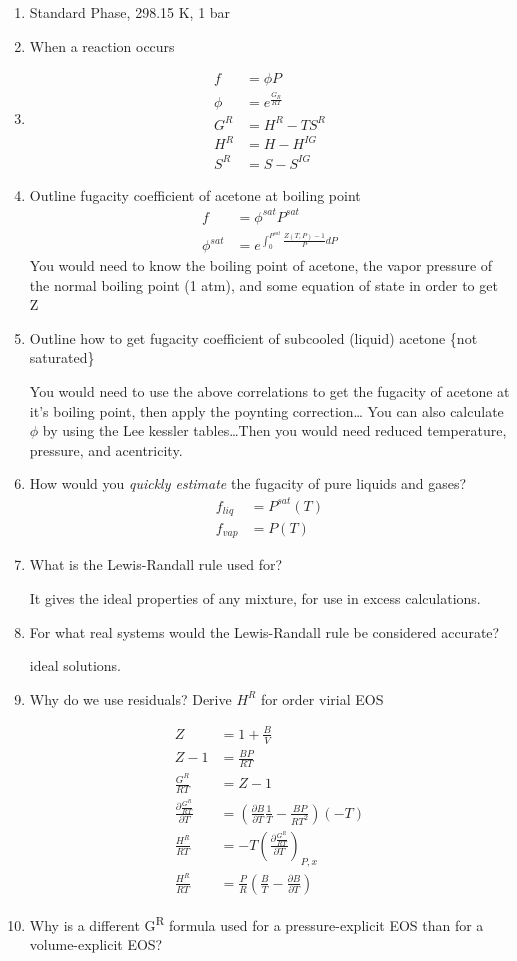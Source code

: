 \documentclass[a4paper]{article}
\begin{document}
\begin{enumerate}
\item Standard Phase, 298.15 K, 1 bar
\item When a reaction occurs
\item \begin{eqnarray}
        f&=\phi P \\
	\phi&=e^{\frac{G_{R}}{RT}}\\
	G^{R}&=H^{R}-TS^{R}\\
	H^R&=H-H^{IG}\\
	S^R&=S-S^{IG}
	\end{eqnarray}
\item Outline fugacity coefficient of acetone at boiling point \begin{eqnarray}
		f&=\phi^{sat} P^{sat}\\
		\phi^{sat}&=e^{\int_{0}^{P^{sat}}{\frac{Z(T,P)-1}{P}}{dP}}
	\end{eqnarray}
	You would need to know the boiling point of acetone, the vapor pressure of the normal boiling point (1 atm), and some equation of state in order to get Z
\item Outline how to get fugacity coefficient of subcooled (liquid) acetone \{not saturated\}
	
	You would need to use the above correlations to get the fugacity of acetone at it's boiling point, then apply the poynting correction\ldots
	You can also calculate $\phi$ by using the Lee kessler tables\ldots Then you would need reduced temperature, pressure, and acentricity.
\item How would you \textit{quickly estimate}  the fugacity of pure liquids and gases?
	\begin{eqnarray}
		f_{liq}&=P^{sat}(T)\\
		f_{vap}&=P(T)
		\label{6}
	\end{eqnarray}
\item What is the Lewis-Randall rule used for?

	It gives the ideal properties of any mixture, for use in excess calculations.
\item For what real systems would the Lewis-Randall rule be considered accurate?

	ideal solutions.
\item Why do we use residuals? Derive $H^R$ for  order virial EOS

	\begin{eqnarray}
		Z&=1+\frac{B}{V}\\
		Z-1&=\frac{BP}{RT}\\
		\frac{G^R}{RT} &=Z-1\\	
		\frac{\partial \frac{G^R}{RT}}{\partial T} &=(\frac{\partial B}{\partial T}\frac{1}{T}-\frac{BP}{RT^2})(-T)\\
		\frac{H^R}{RT} &= -T \left(\frac{ \partial \frac{G^R}{RT}}{\partial T}\right)_{P,x}\\
		\frac{H^R}{RT} &=\frac{P}{R}(\frac{B}{T}-\frac{\partial B}{ \partial T})
	\end{eqnarray}
\item Why is a different G\textsuperscript{R} formula used for a pressure-explicit EOS than for a volume-explicit EOS?


\end{enumerate}
\end{document}
